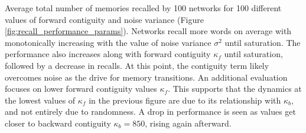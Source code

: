    Average total number of memories recalled by 100 networks for 100 different values of forward contiguity and noise variance (Figure \ref{fig:recall_performance_params}).
    Networks recall more words on average with monotonically increasing 
    with the value of noise variance \(\sigma^{2}\) until saturation.
    The performance also increases along with forward contiguity \(\kappa_{f}\) until saturation, followed by a decrease in recalls.
    At this point, the contiguity term likely overcomes noise as the drive for memory transitions.
    An additional evaluation focuses on lower forward contiguity values \(\kappa_{f}\).
    This supports that the dynamics at the lowest values of \(\kappa_{f}\) in the previous figure are due to its relationship with \(\kappa_{b}\), and not entirely due to randomness.
    A drop in performance is seen as values get closer to backward contiguity \(\kappa_{b} = 850\), rising again afterward.
        
